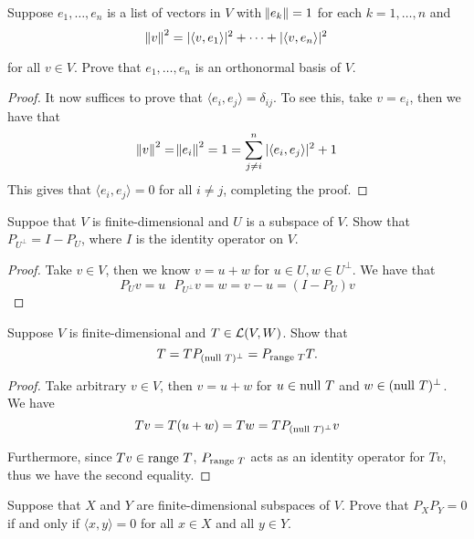\documentclass{extarticle}
\begin{document}
\begin{problem}{4}
    Suppose \(e_1, \ldots, e_n\) is a list of vectors in \(V\) with \(\norm{e_k} = 1\) for each 
    \(k = 1, \ldots, n\) and 
    \[\norm{v}^2 = | \langle v,e_1 \rangle |^2 + \cdots + |\langle v,e_n \rangle|^2\]

    for all \(v \in V\). Prove that \(e_1, \ldots, e_n\) is an orthonormal basis of \(V\). 
\end{problem}

\begin{proof}
It now suffices to prove that \(\langle e_i,e_j \rangle = \delta_{ij}\). To see this, take \(v = e_i\), 
then we have that 
\[\norm{v}^2 = \norm{e_i}^2 = 1 = \sum_{j \neq i}^{n} |\langle e_i,e_j \rangle|^2 + 1 \]
This gives that \(\langle e_i,e_j \rangle = 0\) for all \(i \neq j\), completing the proof.
\end{proof}

\begin{problem}{5}
    Suppoe that \(V\) is finite-dimensional and \(U\) is a subspace of \(V\). Show that 
    \(P_{U^\perp} = I - P_U\), where \(I\) is the identity operator on \(V\).
\end{problem}

\begin{proof}
Take \(v \in V\), then we know \(v = u + w\) for \(u \in U, w \in U^\perp\). We have that 
\[P_U v = u \ \ \ P_{U^\perp} v = w = v - u = (I - P_U)v\]
\end{proof}

\begin{problem}{6}
    Suppose \(V\) is finite-dimensional and \(T \in \mathcal{L}(V, W)\). Show that 
    \[T = TP_{(\text{null } T)^\perp} = P_{\text{range } T}T.\]
\end{problem}

\begin{proof}
Take arbitrary \(v \in V\), then \(v = u + w\) for \(u \in \text{null } T\) and \(w \in (\text{null } T)^\perp\). We have 
\[Tv = T(u + w) = Tw = T P_{(\text{null } T)^\perp}v\]

Furthermore, since \(Tv \in \text{range } T\), \(P_{\text{range } T}\) acts as an identity operator for \(Tv\), thus 
we have the second equality.



\end{proof}


\begin{problem}{7}
    Suppose that \(X\) and \(Y\) are finite-dimensional subspaces of \(V\). Prove that 
    \(P_XP_Y = 0\) if and only if \(\langle x,y \rangle = 0\) for all \(x \in X\) and all \(y \in Y\).
\end{problem}
\end{document}

